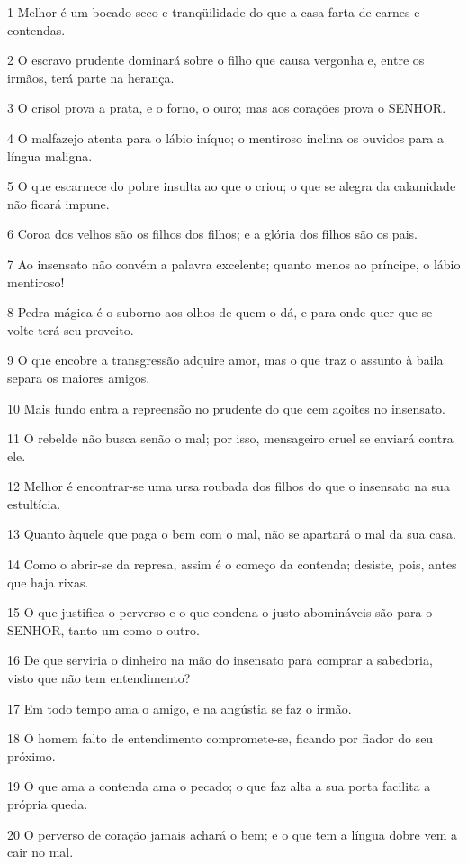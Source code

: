 \par 1 Melhor é um bocado seco e tranqüilidade do que a casa farta de carnes e contendas.
\par 2 O escravo prudente dominará sobre o filho que causa vergonha e, entre os irmãos, terá parte na herança.
\par 3 O crisol prova a prata, e o forno, o ouro; mas aos corações prova o SENHOR.
\par 4 O malfazejo atenta para o lábio iníquo; o mentiroso inclina os ouvidos para a língua maligna.
\par 5 O que escarnece do pobre insulta ao que o criou; o que se alegra da calamidade não ficará impune.
\par 6 Coroa dos velhos são os filhos dos filhos; e a glória dos filhos são os pais.
\par 7 Ao insensato não convém a palavra excelente; quanto menos ao príncipe, o lábio mentiroso!
\par 8 Pedra mágica é o suborno aos olhos de quem o dá, e para onde quer que se volte terá seu proveito.
\par 9 O que encobre a transgressão adquire amor, mas o que traz o assunto à baila separa os maiores amigos.
\par 10 Mais fundo entra a repreensão no prudente do que cem açoites no insensato.
\par 11 O rebelde não busca senão o mal; por isso, mensageiro cruel se enviará contra ele.
\par 12 Melhor é encontrar-se uma ursa roubada dos filhos do que o insensato na sua estultícia.
\par 13 Quanto àquele que paga o bem com o mal, não se apartará o mal da sua casa.
\par 14 Como o abrir-se da represa, assim é o começo da contenda; desiste, pois, antes que haja rixas.
\par 15 O que justifica o perverso e o que condena o justo abomináveis são para o SENHOR, tanto um como o outro.
\par 16 De que serviria o dinheiro na mão do insensato para comprar a sabedoria, visto que não tem entendimento?
\par 17 Em todo tempo ama o amigo, e na angústia se faz o irmão.
\par 18 O homem falto de entendimento compromete-se, ficando por fiador do seu próximo.
\par 19 O que ama a contenda ama o pecado; o que faz alta a sua porta facilita a própria queda.
\par 20 O perverso de coração jamais achará o bem; e o que tem a língua dobre vem a cair no mal.
